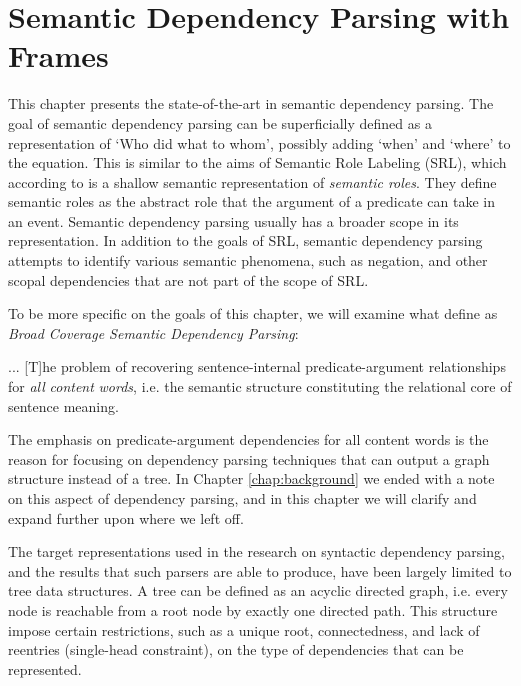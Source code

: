 \chapter{Semantic Dependency Parsing with Frames}
\label{chap:semantic}

This chapter presents the state-of-the-art in semantic dependency parsing. The goal of semantic dependency parsing can be superficially defined as a representation of `Who did what to whom', possibly adding `when' and `where' to the equation. This is similar to the aims of Semantic Role Labeling (SRL), which according to \cite{Jur:Mar:09} is a shallow semantic representation of \textit{semantic roles}. They define semantic roles as the abstract role that the argument of a predicate can take in an event. Semantic dependency parsing usually has a broader scope in its representation. In addition to the goals of SRL, semantic dependency parsing attempts to identify various semantic phenomena, such as negation, and other scopal dependencies that are not part of the scope of SRL.

To be more specific on the goals of this chapter, we will examine what  define as \textit{Broad Coverage Semantic Dependency Parsing}:

\begin{displayquote}
... [T]he problem of recovering sentence-internal predicate-argument relationships for \textit{all} \textit{content} \textit{words}, i.e. the semantic structure constituting the relational core of sentence meaning.
\end{displayquote}

The emphasis on predicate-argument dependencies for all content words is the reason for focusing on dependency parsing techniques that can output a graph structure instead of a tree. In Chapter \ref{chap:background} we ended with a note on this aspect of dependency parsing, and in this chapter we will clarify and expand further upon where we left off.

The target representations used in the research on syntactic dependency parsing, and the results that such parsers are able to produce, have been largely limited to tree data structures. A tree can be defined as an acyclic directed graph, i.e. every node is reachable from a root node by exactly one directed path. This structure impose certain restrictions, such as a unique root, connectedness, and lack of reentries (single-head constraint), on the type of dependencies that can be represented.

